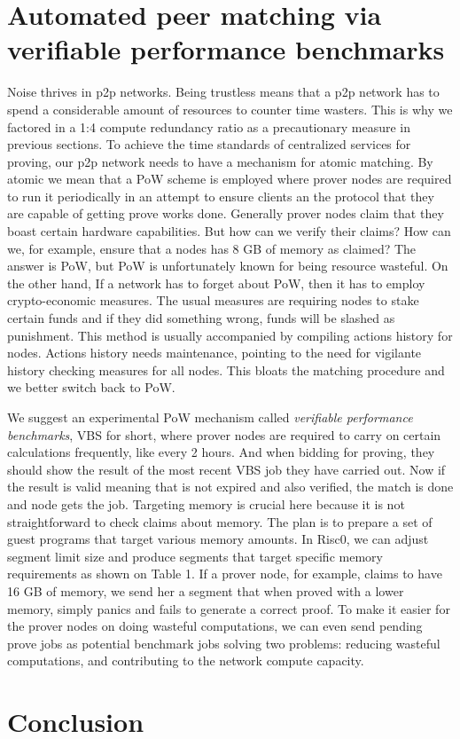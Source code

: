 \documentclass[a4paper, 10pt]{article}
\begin{document}
\section{Automated peer matching via verifiable performance benchmarks}
Noise thrives in p2p networks. Being trustless means that a p2p network has to spend a considerable amount of resources to counter time wasters. This is why we factored in a 1:4 compute redundancy ratio as a precautionary measure in previous sections. To achieve the time standards of centralized services for proving, our p2p network needs to have a mechanism for atomic matching. By atomic we mean that a PoW scheme is employed where prover nodes are required to run it periodically in an attempt to ensure clients an the protocol that they are capable of getting prove works done. Generally prover nodes claim that they boast certain hardware capabilities. But how can we verify their claims? How can we, for example, ensure that a nodes has 8 GB of memory as claimed? The answer is PoW, but PoW is unfortunately known for being resource wasteful. On the other hand, If a network has to forget about PoW, then it has to employ crypto-economic measures. The usual measures are requiring nodes to stake certain funds and if they did something wrong, funds will be slashed as punishment. This method is usually accompanied by compiling actions history for nodes. Actions history needs maintenance, pointing to the need for vigilante history checking measures for all nodes. This bloats the matching procedure and we better switch back to PoW.
\par
We suggest an experimental PoW mechanism called \textit{verifiable performance benchmarks}, VBS for short, where prover nodes are required to carry on certain calculations frequently, like every 2 hours. And when bidding for proving, they should show the result of the most recent VBS job they have carried out. Now if the result is valid meaning that is not expired and also verified, the match is done and node gets the job. Targeting memory is crucial here because it is not straightforward to check claims about memory. The plan is to prepare a set of guest programs that target various memory amounts. In Risc0, we can adjust segment limit size and produce segments that target specific memory requirements as shown on Table 1. If a prover node, for example, claims to have 16 GB of memory, we send her a segment that when proved with a lower memory, simply panics and fails to generate a correct proof. To make it easier for the prover nodes on doing wasteful computations, we can even send pending prove jobs as potential benchmark jobs solving two problems: reducing wasteful computations, and contributing to the network compute capacity.

\section*{Conclusion}
\end{document}

